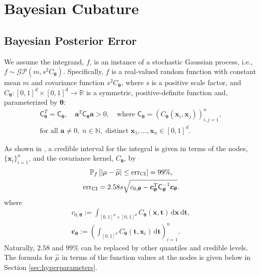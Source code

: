 \documentclass{svjour3}                     %
\newcommand{\bm}[1]{\boldsymbol{#1}}
\newcommand{\dif}[1]{\text{d}{#1}}
\newcommand{\D}[1]{\text{d}{#1}}
\newcommand{\vtheta}{{\bm{\theta}}}
\newcommand{\va}{\bm{a}}
\newcommand{\vc}{\bm{c}}
\newcommand{\vt}{\bm{t}}
\newcommand{\vx}{\bm{x}}
\newcommand{\mC}{\mathsf{C}}
\newcommand{\hmu}{\widehat{\mu}}
\newcommand{\CI}{\textup{CI}}
\newcommand{\err}{\textup{err}}
\begin{document}


\section{Bayesian Cubature}
\label{sec:BC} 

\subsection{Bayesian Posterior Error}
\label{sec:BayesPostErr}

We assume the integrand, $f$, is an instance of a stochastic Gaussian process, i.e., $f \sim \mathcal{GP}(m,s^2 C_\vtheta)$.  Specifically, $f$ is a real-valued random function with constant mean $m$ and covariance function $s^2C_\vtheta$, where $s$ is a positive scale factor, and $C_\vtheta: [0,1]^d \times [0,1]^d \to \mathbb{R} $ is a symmetric, positive-definite function and, parameterized by $\vtheta$:
\begin{multline} \label{FJH:eq:CondPosDef}
\mC_\vtheta^T = \mC_\vtheta,  \quad \va^T \mC_\vtheta \va > 0, \quad \text{where }  \mC_\vtheta = \left(  C_\vtheta(\vx_i,\vx_j)  \right)_{i,j=1}^n,\\
\text{for all } \va \ne 0, \;
n\in \mathbb{N}, \; \text{distinct} \; \vx_1, \ldots, \vx_n \in [0,1]^d.
\end{multline}

As shown in \cite{RatHic19a}, a credible interval for the integral is given in terms of the nodes, $\{\vx_i\}_{i=1}^n$, and the covariance kernel, $C_\vtheta$,  by 
\begin{subequations} \label{eqn_prob_confidence_interval}
	\begin{gather}
	\mathbb{P}_f \left[
	|\mu-\hmu| \leq \err_{\CI}
	\right] = 99\%, \\
	\err_{\CI} = 2.58 s \sqrt{c_{0,\vtheta} - \vc_\vtheta^T\mC_\vtheta^{-1}\vc_\vtheta}.
	\end{gather}
\end{subequations}
where
\begin{subequations} \label{eqn:fGaussDist}
\begin{gather}
\label{eqn:fGaussDist_c0}
	c_{0,\vtheta} := \int_{[0,1]^{d} \times [0,1]^{d}} C_\vtheta(\vx,\vt) \, \dif{\vx} \, \dif{\vt}, \\
	\label{eqn:fGaussDist_vc}
 \vc_\vtheta := \left(  \int_{[0,1]^d} C_\vtheta(\vt,\vx_i) \, \D \vt \right)_{i=1}^n.
	\end{gather}
\end{subequations}
Naturally, $2.58$ and $99\%$ can be replaced by other quantiles and credible levels.  The formula for $\hmu$ in terms of the function values at the nodes is given below in Section \ref{sec:hyperparameters}.
\end{document}
